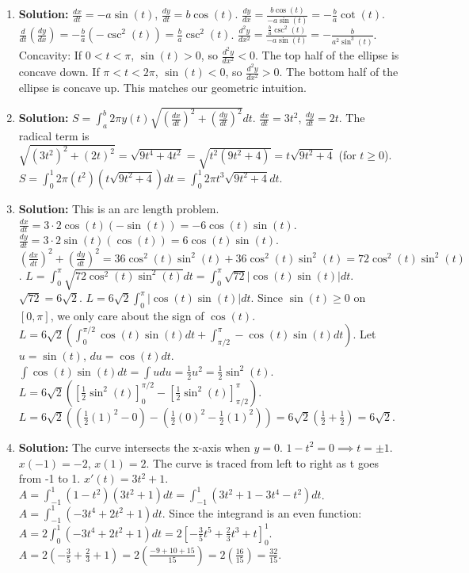 \documentclass{article}
\begin{document}
\begin{enumerate}
\item \textbf{Solution:}
$\frac{dx}{dt} = -a\sin(t)$, $\frac{dy}{dt} = b\cos(t)$.
$\frac{dy}{dx} = \frac{b\cos(t)}{-a\sin(t)} = -\frac{b}{a}\cot(t)$.
$\frac{d}{dt}(\frac{dy}{dx}) = -\frac{b}{a}(-\csc^2(t)) = \frac{b}{a}\csc^2(t)$.
$\frac{d^2y}{dx^2} = \frac{\frac{b}{a}\csc^2(t)}{-a\sin(t)} = -\frac{b}{a^2\sin^3(t)}$.
Concavity:
If $0 < t < \pi$, $\sin(t) > 0$, so $\frac{d^2y}{dx^2} < 0$. The top half of the ellipse is concave down.
If $\pi < t < 2\pi$, $\sin(t) < 0$, so $\frac{d^2y}{dx^2} > 0$. The bottom half of the ellipse is concave up. This matches our geometric intuition.

\item \textbf{Solution:}
$S = \int_a^b 2\pi y(t) \sqrt{(\frac{dx}{dt})^2 + (\frac{dy}{dt})^2} dt$.
$\frac{dx}{dt} = 3t^2$, $\frac{dy}{dt} = 2t$.
The radical term is $\sqrt{(3t^2)^2+(2t)^2} = \sqrt{9t^4+4t^2} = \sqrt{t^2(9t^2+4)} = t\sqrt{9t^2+4}$ (for $t \ge 0$).
$S = \int_0^1 2\pi (t^2) (t\sqrt{9t^2+4}) dt = \int_0^1 2\pi t^3\sqrt{9t^2+4} dt$.

\item \textbf{Solution:} This is an arc length problem.
$\frac{dx}{dt} = 3 \cdot 2\cos(t)(-\sin(t)) = -6\cos(t)\sin(t)$.
$\frac{dy}{dt} = 3 \cdot 2\sin(t)(\cos(t)) = 6\cos(t)\sin(t)$.
$(\frac{dx}{dt})^2 + (\frac{dy}{dt})^2 = 36\cos^2(t)\sin^2(t) + 36\cos^2(t)\sin^2(t) = 72\cos^2(t)\sin^2(t)$.
$L = \int_0^\pi \sqrt{72\cos^2(t)\sin^2(t)} dt = \int_0^\pi \sqrt{72}|\cos(t)\sin(t)| dt$.
$\sqrt{72} = 6\sqrt{2}$.
$L = 6\sqrt{2} \int_0^\pi |\cos(t)\sin(t)| dt$.
Since $\sin(t) \ge 0$ on $[0,\pi]$, we only care about the sign of $\cos(t)$.
$L = 6\sqrt{2} \left( \int_0^{\pi/2} \cos(t)\sin(t) dt + \int_{\pi/2}^{\pi} -\cos(t)\sin(t) dt \right)$.
Let $u=\sin(t)$, $du=\cos(t)dt$.
$\int \cos(t)\sin(t)dt = \int u du = \frac{1}{2}u^2 = \frac{1}{2}\sin^2(t)$.
$L = 6\sqrt{2} \left( \left[\frac{1}{2}\sin^2(t)\right]_0^{\pi/2} - \left[\frac{1}{2}\sin^2(t)\right]_{\pi/2}^{\pi} \right)$.
$L = 6\sqrt{2} \left( (\frac{1}{2}(1)^2 - 0) - (\frac{1}{2}(0)^2 - \frac{1}{2}(1)^2) \right) = 6\sqrt{2}(\frac{1}{2} + \frac{1}{2}) = 6\sqrt{2}$.

\item \textbf{Solution:} The curve intersects the x-axis when $y=0$.
$1-t^2=0 \implies t = \pm 1$.
$x(-1) = -2$, $x(1) = 2$. The curve is traced from left to right as t goes from -1 to 1.
$x'(t) = 3t^2+1$.
$A = \int_{-1}^1 (1-t^2)(3t^2+1) dt = \int_{-1}^1 (3t^2+1-3t^4-t^2) dt$.
$A = \int_{-1}^1 (-3t^4+2t^2+1) dt$.
Since the integrand is an even function:
$A = 2 \int_0^1 (-3t^4+2t^2+1) dt = 2 \left[ -\frac{3}{5}t^5 + \frac{2}{3}t^3 + t \right]_0^1$.
$A = 2(-\frac{3}{5} + \frac{2}{3} + 1) = 2(\frac{-9+10+15}{15}) = 2(\frac{16}{15}) = \frac{32}{15}$.


\end{enumerate}
\end{document}
